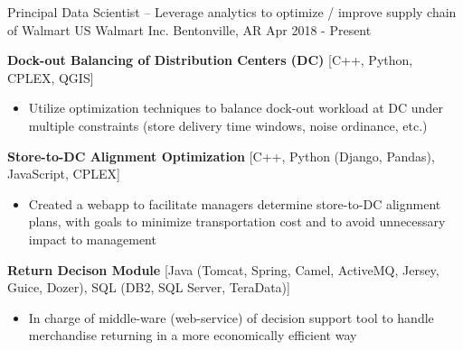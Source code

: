 

\begin{cventries}


\cventry
{Principal Data Scientist \tiny{-- Leverage analytics to optimize / improve supply chain of Walmart US}}          %
{Walmart Inc.}                      %
{Bentonville, AR}                   %
{Apr 2018 - Present}                    %
{
    \begin{cvitems}
    \item {
        \textbf{Dock-out Balancing of Distribution Centers (DC)}  
        {\small{[C++, Python, CPLEX, QGIS]}}   
        \begin{itemize}
            \item  Utilize optimization techniques to balance dock-out workload at DC under multiple constraints (store delivery time windows, noise ordinance, etc.) 
        \end{itemize}           
    }
    \item {
        \textbf{Store-to-DC Alignment Optimization} 
        {\small{[C++, Python (Django, Pandas), JavaScript,  CPLEX]}}
        \begin{itemize}
            \item  Created a webapp to facilitate managers determine store-to-DC alignment plans, with goals to minimize transportation cost and to avoid unnecessary impact to management 
        \end{itemize}           
    }
    \item {
        \textbf{Return Decison Module} 
        {\small{[Java (Tomcat, Spring, Camel, ActiveMQ, Jersey, Guice, Dozer), SQL (DB2, SQL Server, TeraData)]}}
        \begin{itemize}
            \item  In charge of middle-ware (web-service) of decision support tool to handle merchandise returning in a more economically efficient way
        \end{itemize}           
    }
    \end{cvitems}%
}


\end{cventries}
